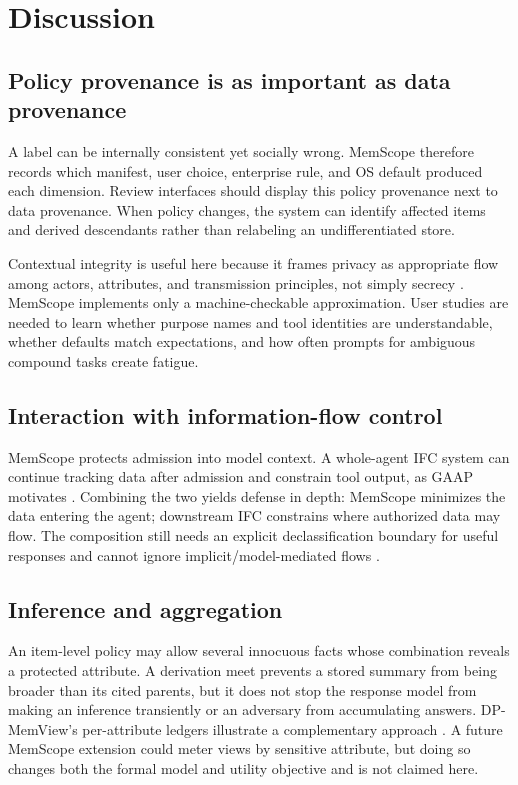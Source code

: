 \section{Discussion}
\label{sec:discussion}

\subsection{Policy provenance is as important as data provenance}

A label can be internally consistent yet socially wrong. MemScope therefore records which manifest, user choice, enterprise rule, and OS default produced each dimension. Review interfaces should display this policy provenance next to data provenance. When policy changes, the system can identify affected items and derived descendants rather than relabeling an undifferentiated store.

Contextual integrity is useful here because it frames privacy as appropriate flow among actors, attributes, and transmission principles, not simply secrecy \citep{nissenbaum2010privacy}. MemScope implements only a machine-checkable approximation. User studies are needed to learn whether purpose names and tool identities are understandable, whether defaults match expectations, and how often prompts for ambiguous compound tasks create fatigue.

\subsection{Interaction with information-flow control}

MemScope protects admission into model context. A whole-agent IFC system can continue tracking data after admission and constrain tool output, as GAAP motivates \citep{stanley2026gaap}. Combining the two yields defense in depth: MemScope minimizes the data entering the agent; downstream IFC constrains where authorized data may flow. The composition still needs an explicit declassification boundary for useful responses and cannot ignore implicit/model-mediated flows \citep{sabelfeld2003language}.

\subsection{Inference and aggregation}

An item-level policy may allow several innocuous facts whose combination reveals a protected attribute. A derivation meet prevents a stored summary from being broader than its cited parents, but it does not stop the response model from making an inference transiently or an adversary from accumulating answers. DP-MemView's per-attribute ledgers illustrate a complementary approach \citep{kim2026dpmemview}. A future MemScope extension could meter views by sensitive attribute, but doing so changes both the formal model and utility objective and is not claimed here.

